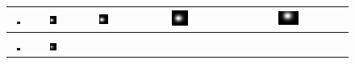 \documentclass[conference,compsoc]{IEEEtran}
\begin{document}
\begin{figure}[t!]
\setlength\tabcolsep{0.1em}
\begin{tabular}{ccccc}
\includegraphics[width=0.19\textwidth]{images/true-field-t=50} &
\includegraphics[width=0.19\textwidth]{images/true-field-t=641} &
\includegraphics[width=0.19\textwidth]{images/true-field-t=1232} &
\includegraphics[width=0.19\textwidth]{images/true-field-t=3006} &
\includegraphics[width=0.19\textwidth]{images/true-field-t=4089} \\
\hline \\
\includegraphics[width=0.19\textwidth]{images/field-t=50} & 
\includegraphics[width=0.19\textwidth]{images/field-t=641} &

\end{tabular}
\end{figure}
\end{document}
